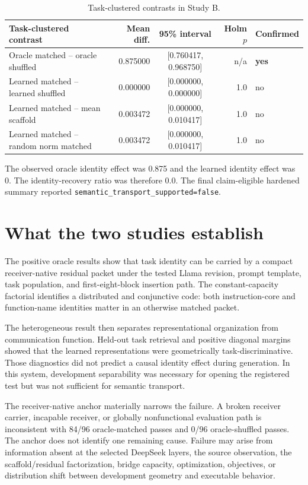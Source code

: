 \documentclass[11pt]{article}
\newcommand{\yes}{\textbf{yes}}
\newcommand{\no}{no}
\begin{document}
\begin{table}[htbp]
\centering
\caption{Task-clustered contrasts in Study B.}
\label{tab:study-b-contrasts}
\scriptsize
\begin{tabularx}{\textwidth}{>{\raggedright\arraybackslash}X r c r l}
\toprule
Task-clustered contrast & Mean diff. & 95\% interval & Holm \(p\) & Confirmed \\
\midrule
Oracle matched -- oracle shuffled & 0.875000 & [0.760417, 0.968750] & n/a & \yes \\
Learned matched -- learned shuffled & 0.000000 & [0.000000, 0.000000] & 1.0 & \no \\
Learned matched -- mean scaffold & 0.003472 & [0.000000, 0.010417] & 1.0 & \no \\
Learned matched -- random norm matched & 0.003472 & [0.000000, 0.010417] & 1.0 & \no \\
\bottomrule
\end{tabularx}
\end{table}

The observed oracle identity effect was 0.875 and the learned identity effect was 0. The identity-recovery ratio was therefore 0.0. The final claim-eligible hardened summary reported \texttt{semantic\_transport\_supported=false}.

\section{What the two studies establish}

The positive oracle results show that task identity can be carried by a compact receiver-native residual packet under the tested Llama revision, prompt template, task population, and first-eight-block insertion path. The constant-capacity factorial identifies a distributed and conjunctive code: both instruction-core and function-name identities matter in an otherwise matched packet.

The heterogeneous result then separates representational organization from communication function. Held-out task retrieval and positive diagonal margins showed that the learned representations were geometrically task-discriminative. Those diagnostics did not predict a causal identity effect during generation. In this system, development separability was necessary for opening the registered test but was not sufficient for semantic transport.

The receiver-native anchor materially narrows the failure. A broken receiver carrier, incapable receiver, or globally nonfunctional evaluation path is inconsistent with 84/96 oracle-matched passes and 0/96 oracle-shuffled passes. The anchor does not identify one remaining cause. Failure may arise from information absent at the selected DeepSeek layers, the source observation, the scaffold/residual factorization, bridge capacity, optimization, objectives, or distribution shift between development geometry and executable behavior.
\end{document}
